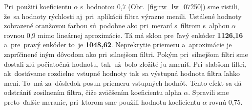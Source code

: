 Pri~použití koeficientu $\alpha$ s~hodnotou 0,7 (Obr.~\ref{fig:rw_lw_07250}) sme zistili, že~sa hodnoty rýchlosti aj~pri~aplikácii
filtra výrazne menili. Ustálené hodnoty zobrazené oranžovou farbou sú~podobne ako pri~meraní s~filtrom s~alphou $\alpha$
rovnou 0,9 mimo lineárnej aproximácie. Tá má sklon pre~ľavý enkóder \textbf{1126,16} a~pre~pravý enkóder to~je
\textbf{1048,62}. Neprekrytie priemeru a~aproximácie je zapríčinené iným dôvodom ako pri~silnejšom filtri. Pokým
pri~silnejšom filtri sme dostali zlú počiatočnú hodnotu, tak~už~bolo zložité ju zmeniť. Pri~slabšom filtri, ak~dostávame
rozdielne vstupné hodnoty tak~sa výstupná hodnota filtra ľahko mení. To~má za~dôsledok posun priemeru vstupných hodnôt.
Tento efekt sa dá odstrániť zosilnením filtra, čiže zväčšením koeficientu alpha $\alpha$. Spravili sme preto~ďalšie meranie,
pri~ktorom sme použili hodnotu koeficientu $\alpha$ rovnú 0,75.

